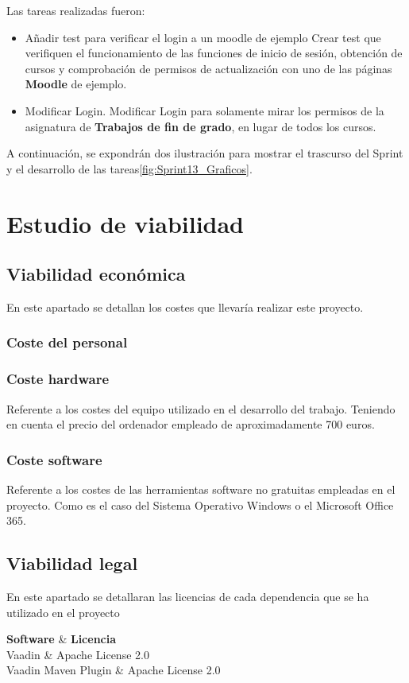 Las tareas realizadas fueron:
\begin{itemize}
	\tightlist
	\item Añadir test para verificar el login a un moodle de ejemplo
		Crear test que verifiquen el funcionamiento de las funciones de inicio de sesión, obtención de cursos y comprobación de permisos de actualización con uno de las páginas \textbf{Moodle} de ejemplo.
	\item Modificar Login.
		Modificar Login para solamente mirar los permisos de la asignatura de \textbf{Trabajos de fin de grado}, en lugar de todos los cursos.
	
\end{itemize}

A continuación, se expondrán dos ilustración para mostrar el trascurso del Sprint y el desarrollo de las tareas\ref{fig:Sprint13_Graficos}.



\section{Estudio de viabilidad}
\subsection{Viabilidad económica}
En este apartado se detallan los costes que llevaría realizar este proyecto.

\subsubsection{Coste del personal}

\subsubsection{Coste hardware}
Referente a los costes del equipo utilizado en el desarrollo del trabajo. Teniendo en cuenta el precio del ordenador empleado de aproximadamente 700 euros.

\subsubsection{Coste software}
Referente a los costes de las herramientas software no gratuitas empleadas en el proyecto. Como es el caso del Sistema Operativo Windows o el Microsoft Office 365.

\subsection{Viabilidad legal}
En este apartado se detallaran las licencias de cada dependencia que se ha utilizado en el proyecto

{\textbf{Software} & \textbf{Licencia} \\}{
	Vaadin & Apache License 2.0 \\
	Vaadin Maven Plugin & Apache License 2.0 \\
}